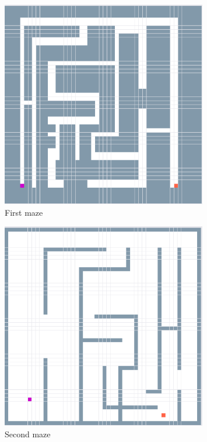 \begin{figure}
  \centering
    \includegraphics[width=0.8\textwidth]{maze_gpgpu_exp/1_maze_gpgpu}%
    
  \caption{First maze}
  \label{fig:maze_gpgpu_exp/1_maze_gpgpu}
\end{figure}

\begin{figure}
  \centering
    \includegraphics[width=0.8\textwidth]{generic_maze_exp/1_generic_maze}%
    
  \caption{Second maze}
  \label{fig:generic_maze_exp/1_generic_maze}
\end{figure}

